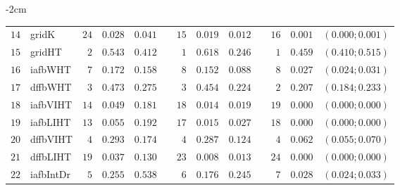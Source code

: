 \begin{table*}[!htbp]
\begin{adjustwidth*}{}{-2cm}
\begin{tabular}{@{}rlrrrrrrrrrcc@{}}
\footnotesize{$14$} & \footnotesize{gridK    } & \footnotesize{$24$} & \footnotesize{$0.028$} & \footnotesize{$0.041$} && \footnotesize{$15$} & \footnotesize{$0.019$} & \footnotesize{$0.012$} && \footnotesize{$16$} & \footnotesize{$0.001$} & \footnotesize{$(0.000;0.001)$} \\
\footnotesize{$15$} & \footnotesize{gridHT   } & \footnotesize{$2 $} & \footnotesize{$0.543$} & \footnotesize{$0.412$} && \footnotesize{$1 $} & \footnotesize{$0.618$} & \footnotesize{$0.246$} && \footnotesize{$1 $} & \footnotesize{$0.459$} & \footnotesize{$(0.410;0.515)$} \\
\footnotesize{$16$} & \footnotesize{iafbWHT  } & \footnotesize{$7 $} & \footnotesize{$0.172$} & \footnotesize{$0.158$} && \footnotesize{$8 $} & \footnotesize{$0.152$} & \footnotesize{$0.088$} && \footnotesize{$8 $} & \footnotesize{$0.027$} & \footnotesize{$(0.024;0.031)$} \\
\footnotesize{$17$} & \footnotesize{dffbWHT  } & \footnotesize{$3 $} & \footnotesize{$0.473$} & \footnotesize{$0.275$} && \footnotesize{$3 $} & \footnotesize{$0.454$} & \footnotesize{$0.224$} && \footnotesize{$2 $} & \footnotesize{$0.207$} & \footnotesize{$(0.184;0.233)$} \\
\footnotesize{$18$} & \footnotesize{iafbVIHT } & \footnotesize{$14$} & \footnotesize{$0.049$} & \footnotesize{$0.181$} && \footnotesize{$18$} & \footnotesize{$0.014$} & \footnotesize{$0.019$} && \footnotesize{$19$} & \footnotesize{$0.000$} & \footnotesize{$(0.000;0.000)$} \\
\footnotesize{$19$} & \footnotesize{iafbLIHT } & \footnotesize{$13$} & \footnotesize{$0.055$} & \footnotesize{$0.192$} && \footnotesize{$17$} & \footnotesize{$0.015$} & \footnotesize{$0.027$} && \footnotesize{$18$} & \footnotesize{$0.000$} & \footnotesize{$(0.000;0.000)$} \\
\footnotesize{$20$} & \footnotesize{dffbVIHT } & \footnotesize{$4 $} & \footnotesize{$0.293$} & \footnotesize{$0.174$} && \footnotesize{$4 $} & \footnotesize{$0.287$} & \footnotesize{$0.124$} && \footnotesize{$4 $} & \footnotesize{$0.062$} & \footnotesize{$(0.055;0.070)$} \\
\footnotesize{$21$} & \footnotesize{dffbLIHT } & \footnotesize{$19$} & \footnotesize{$0.037$} & \footnotesize{$0.130$} && \footnotesize{$23$} & \footnotesize{$0.008$} & \footnotesize{$0.013$} && \footnotesize{$24$} & \footnotesize{$0.000$} & \footnotesize{$(0.000;0.000)$} \\
\footnotesize{$22$} & \footnotesize{iafbIntDr} & \footnotesize{$5 $} & \footnotesize{$0.255$} & \footnotesize{$0.538$} && \footnotesize{$6 $} & \footnotesize{$0.176$} & \footnotesize{$0.245$} && \footnotesize{$7 $} & \footnotesize{$0.028$} & \footnotesize{$(0.024;0.033)$} \\

\end{tabular}
\end{adjustwidth*}
\end{table*}
